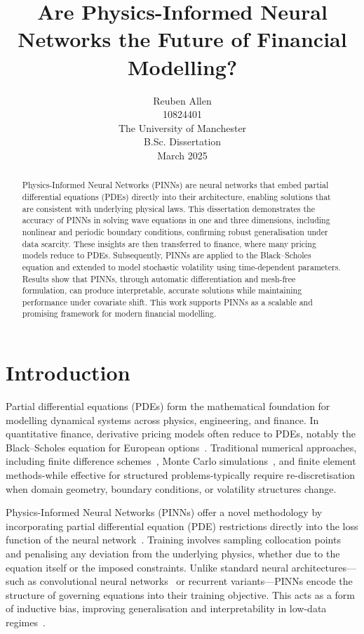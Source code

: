 \documentclass[12pt,a4paper]{article}
\title{Are Physics-Informed Neural Networks the Future of Financial Modelling?}
\author{Reuben Allen \\ 10824401 \\ The University of Manchester \\ B.Sc. Dissertation \\ March 2025}
\date{}
\begin{document}
\maketitle

\begin{abstract}
Physics-Informed Neural Networks (PINNs) are neural networks that embed partial differential equations (PDEs) directly into their architecture, enabling solutions that are consistent with underlying physical laws. This dissertation demonstrates the accuracy of PINNs in solving wave equations in one and three dimensions, including nonlinear and periodic boundary conditions, confirming robust generalisation under data scarcity. These insights are then transferred to finance, where many pricing models reduce to PDEs. Subsequently, PINNs are applied to the Black–Scholes equation and extended to model stochastic volatility using time-dependent parameters. Results show that PINNs, through automatic differentiation and mesh-free formulation, can produce interpretable, accurate solutions while maintaining performance under covariate shift. This work supports PINNs as a scalable and promising framework for modern financial modelling.
\end{abstract}


\newpage
\renewcommand{\contentsname}{\centering\Huge\textbf{Contents}}

    {\Large
    \tableofcontents
    }
\newpage



\section{Introduction}
Partial differential equations (PDEs) form the mathematical foundation for modelling dynamical systems across physics, engineering, and finance. In quantitative finance, derivative pricing models often reduce to PDEs, notably the Black–Scholes equation for European options~\cite{black1973pricing}. Traditional numerical approaches, including finite difference schemes~\cite{leveque2007finite}, Monte Carlo simulations~\cite{morton2005numerical}, and finite element methods-while effective for structured problems-typically require re-discretisation when domain geometry, boundary conditions, or volatility structures change.

Physics-Informed Neural Networks (PINNs) offer a novel methodology by incorporating partial differential equation (PDE) restrictions directly into the loss function of the neural network~\cite{raissi2019physics}. Training involves sampling collocation points and penalising any deviation from the underlying physics, whether due to the equation itself or the imposed constraints. Unlike standard neural architectures—such as convolutional neural networks~\cite{lecun2015deep} or recurrent variants—PINNs encode the structure of governing equations into their training objective. This acts as a form of inductive bias, improving generalisation and interpretability in low-data regimes~\cite{cai2021physics}.
\end{document}
